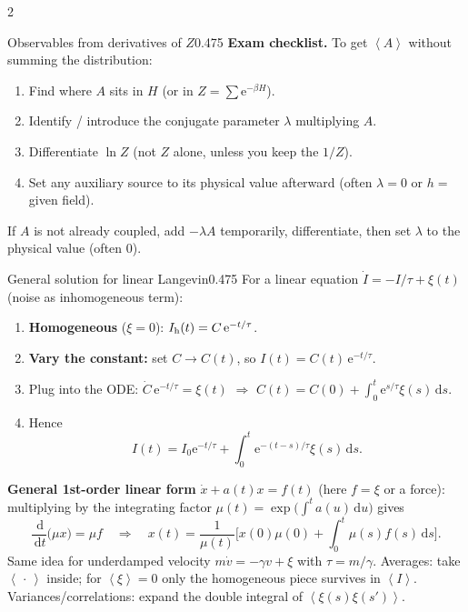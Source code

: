 \documentclass[8pt,a4paper]{extarticle}
\newcommand{\dd}{\,\mathrm d}
\newcommand{\avg}[1]{\left\langle #1\right\rangle}
\newcommand{\e}{\mathrm e}
\newcommand{\kb}{k_{\mathrm B}}
\begin{document}
\begin{multicols*}{2}
\begin{mytikzbox}{Observables from derivatives of $Z$}{0.475}
\textbf{Exam checklist.} To get $\avg A$ without summing the distribution:
\begin{enumerate}
\item Find where $A$ sits in $H$ (or in $Z=\sum\e^{-\beta H}$).
\item Identify / introduce the conjugate parameter $\lambda$ multiplying $A$.
\item Differentiate $\ln Z$ (not $Z$ alone, unless you keep the $1/Z$).
\item Set any auxiliary source to its physical value afterward
(often $\lambda=0$ or $h=$ given field).
\end{enumerate}
If $A$ is not already coupled, add $-\lambda A$ temporarily, differentiate, then set
$\lambda$ to the physical value (often $0$).
\end{mytikzbox}

\begin{mytikzbox}{General solution for linear Langevin}{0.475}
For a linear equation $\dot I=-I/\tau+\xi(t)$ (noise as inhomogeneous term):
\begin{enumerate}
\item \textbf{Homogeneous} ($\xi=0$):
$I_{\rm h}(t)=C\,\e^{-t/\tau}$.
\item \textbf{Vary the constant:} set $C\to C(t)$, so
$I(t)=C(t)\,\e^{-t/\tau}$.
\item Plug into the ODE:
$\dot C\,\e^{-t/\tau}=\xi(t)$ $\Rightarrow$
$C(t)=C(0)+\int_0^t\e^{s/\tau}\xi(s)\dd s$.
\item Hence
\[
I(t)=I_0\e^{-t/\tau}
+\int_0^t\e^{-(t-s)/\tau}\xi(s)\dd s.
\]
\end{enumerate}
\textbf{General 1st-order linear form}
$\dot x+a(t)x=f(t)$ (here $f=\xi$ or a force):
multiplying by the integrating factor
$\mu(t)=\exp\!\bigl(\int^t a(u)\dd u\bigr)$ gives
\[
\frac{\dd}{\dd t}\bigl(\mu x\bigr)=\mu f
\quad\Rightarrow\quad
x(t)=\frac1{\mu(t)}
\Biggl[x(0)\mu(0)
+\int_0^t\mu(s)f(s)\dd s\Biggr].
\]
Same idea for underdamped velocity
$m\dot v=-\gamma v+\xi$ with $\tau=m/\gamma$.
Averages: take $\avg{\,\cdot\,}$ inside; for
$\avg{\xi}=0$ only the homogeneous piece survives in $\avg I$.
Variances/correlations: expand the double integral of
$\avg{\xi(s)\xi(s')}$.
\end{mytikzbox}



\end{multicols*}
\end{document}
